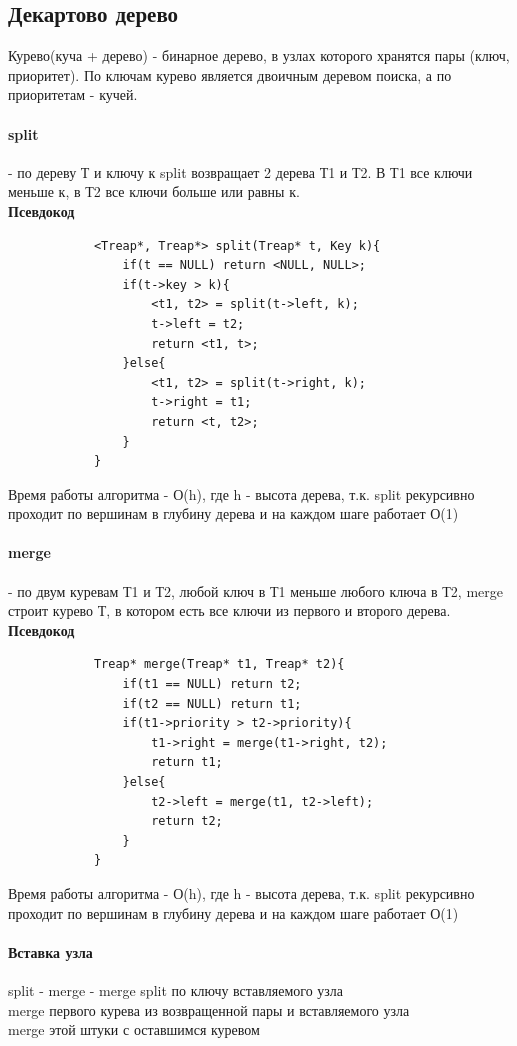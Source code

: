 \documentclass[a4paper,10pt]{article}
\begin{document}
\subsection{Декартово дерево}
Курево(куча + дерево) - бинарное дерево, в узлах которого хранятся пары (ключ, приоритет). По ключам курево является двоичным деревом поиска, а по приоритетам - кучей.
\paragraph{split} - по дереву Т и ключу к split возвращает 2 дерева Т1 и Т2. В Т1 все ключи меньше к, в Т2 все ключи больше или равны к.\\
\textbf{Псевдокод}\\
\begin{center}
		\begin{lstlisting}
			<Treap*, Treap*> split(Treap* t, Key k){
				if(t == NULL) return <NULL, NULL>;
				if(t->key > k){
					<t1, t2> = split(t->left, k);
					t->left = t2;
					return <t1, t>;
				}else{
					<t1, t2> = split(t->right, k);
					t->right = t1;
					return <t, t2>;
				}
			}
		\end{lstlisting}
	\end{center}
Время работы алгоритма - О(h), где h - высота дерева, т.к. split рекурсивно проходит по вершинам в глубину дерева и на каждом шаге работает О(1)
\paragraph{merge} - по двум куревам Т1 и Т2, любой ключ в Т1 меньше любого ключа в Т2, merge строит курево Т, в котором есть все ключи из первого и второго дерева.\\
\textbf{Псевдокод}\\
\begin{center}
		\begin{lstlisting}
			Treap* merge(Treap* t1, Treap* t2){
				if(t1 == NULL) return t2;
				if(t2 == NULL) return t1;
				if(t1->priority > t2->priority){
					t1->right = merge(t1->right, t2);
					return t1;
				}else{
					t2->left = merge(t1, t2->left);
					return t2;
				}
			}
		\end{lstlisting}
	\end{center}
Время работы алгоритма - О(h), где h - высота дерева, т.к. split рекурсивно проходит по вершинам в глубину дерева и на каждом шаге работает О(1)
\paragraph{Вставка узла} split - merge - merge
split по ключу вставляемого узла\\
merge первого курева из возвращенной пары и вставляемого узла\\
merge этой штуки  с оставшимся куревом
\end{document}
